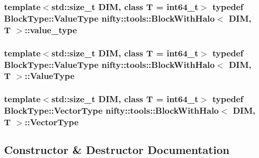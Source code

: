 \subsubsection[{value\+\_\+type}]{\setlength{\rightskip}{0pt plus 5cm}template$<$std\+::size\+\_\+t D\+I\+M, class T  = int64\+\_\+t$>$ typedef {\bf Block\+Type\+::\+Value\+Type} {\bf nifty\+::tools\+::\+Block\+With\+Halo}$<$ D\+I\+M, T $>$\+::{\bf value\+\_\+type}}\label{classnifty_1_1tools_1_1BlockWithHalo_a2b9bb6388ec694b2e1f13399be84356d}
\hypertarget{classnifty_1_1tools_1_1BlockWithHalo_a65d120db84dfca7586ae5ab30f26f01b}{}
\subsubsection[{Value\+Type}]{\setlength{\rightskip}{0pt plus 5cm}template$<$std\+::size\+\_\+t D\+I\+M, class T  = int64\+\_\+t$>$ typedef {\bf Block\+Type\+::\+Value\+Type} {\bf nifty\+::tools\+::\+Block\+With\+Halo}$<$ D\+I\+M, T $>$\+::{\bf Value\+Type}}\label{classnifty_1_1tools_1_1BlockWithHalo_a65d120db84dfca7586ae5ab30f26f01b}
\hypertarget{classnifty_1_1tools_1_1BlockWithHalo_a040d8a654eb42791c6e5fbd4dfd51b9f}{}
\subsubsection[{Vector\+Type}]{\setlength{\rightskip}{0pt plus 5cm}template$<$std\+::size\+\_\+t D\+I\+M, class T  = int64\+\_\+t$>$ typedef {\bf Block\+Type\+::\+Vector\+Type} {\bf nifty\+::tools\+::\+Block\+With\+Halo}$<$ D\+I\+M, T $>$\+::{\bf Vector\+Type}}\label{classnifty_1_1tools_1_1BlockWithHalo_a040d8a654eb42791c6e5fbd4dfd51b9f}


\subsection{Constructor \& Destructor Documentation}
\hypertarget{classnifty_1_1tools_1_1BlockWithHalo_ad80f17f6eea4c3d40e61eda04134ffe6}{}
